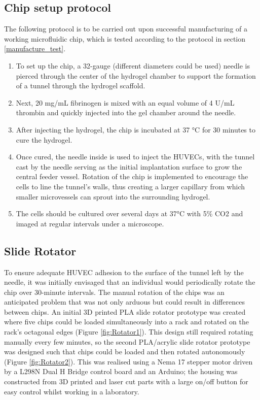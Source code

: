 \documentclass[letterpaper,12pt]{article}
\begin{document}
\subsection{Chip setup protocol}
The following protocol is to be carried out upon successful manufacturing of a working microfluidic chip, which is tested according to the protocol in section \ref{manufacture_test}. 
\begin{enumerate}
    \item To set up the chip, a 32-gauge (different diameters could be used) needle is pierced through the center of the hydrogel chamber to support the formation of a tunnel through the hydrogel scaffold.  
    
    \item Next, 20 mg/mL fibrinogen is mixed with an equal volume of 4 U/mL thrombin and quickly injected into the gel chamber around the needle.  
    
    \item After injecting the hydrogel, the chip is incubated at 37 °C for 30 minutes to cure the hydrogel. 
    
    \item Once cured, the needle inside is used to inject the HUVECs, with the tunnel cast by the needle serving as the initial implantation surface to grow the central feeder vessel. Rotation of the chip is implemented to encourage the cells to line the tunnel’s walls, thus creating a larger capillary from which smaller microvessels can sprout into the surrounding hydrogel. 
    
    \item The cells should be cultured over several days at 37°C with 5\% CO2 and imaged at regular intervals under a microscope.   
\end{enumerate}


\subsection{Slide Rotator}

To ensure adequate HUVEC adhesion to the surface of the tunnel left by the needle, it was initially envisaged that an individual would periodically rotate the chip over 30-minute intervals.  The manual rotation of the chips was an anticipated problem that was not only arduous but could result in differences between chips. An initial 3D printed PLA slide rotator prototype was created where five chips could be loaded simultaneously into a rack and rotated on the rack’s octagonal edges (Figure \ref{fig:Rotator1}). This design still required rotating manually every few minutes, so the second PLA/acrylic slide rotator prototype was designed such that chips could be loaded and then rotated autonomously (Figure \ref{fig:Rotator2}). This was realised using a Nema 17 stepper motor driven by a L298N Dual H Bridge control board and an Arduino; the housing was constructed from 3D printed and laser cut parts with a large on/off button for easy control whilst working in a laboratory.
\end{document}

